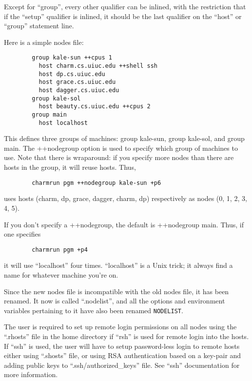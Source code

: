 \begin{itemize}
Except for ``group'', every other qualifier can be inlined, with the
restriction that if the ``setup'' qualifier is inlined, it should be
the last qualifier on the ``host'' or ``group'' statement line.

Here is a simple nodes file:

\begin{verbatim}
        group kale-sun ++cpus 1
          host charm.cs.uiuc.edu ++shell ssh
          host dp.cs.uiuc.edu
          host grace.cs.uiuc.edu
          host dagger.cs.uiuc.edu
        group kale-sol
          host beauty.cs.uiuc.edu ++cpus 2
        group main
          host localhost
\end{verbatim}

This defines three groups of machines: group kale-sun, group kale-sol,
and group main.  The ++nodegroup option is used to specify which group
of machines to use.  Note that there is wraparound: if you specify
more nodes than there are hosts in the group, it will reuse
hosts. Thus,

\begin{verbatim}
        charmrun pgm ++nodegroup kale-sun +p6
\end{verbatim}

uses hosts (charm, dp, grace, dagger, charm, dp) respectively as
nodes (0, 1, 2, 3, 4, 5).

If you don't specify a ++nodegroup, the default is ++nodegroup main.
Thus, if one specifies

\begin{verbatim}
        charmrun pgm +p4
\end{verbatim}

it will use ``localhost'' four times.  ``localhost'' is a Unix
trick; it always find a name for whatever machine you're on.

Since the new nodes file is incompatible with the old nodes file, it has
been renamed.  It now is called ``.nodelist'', and all the options and
environment variables pertaining to it have also been renamed {\tt NODELIST}.

The user is required to set up remote login permissions on all nodes
using the ``.rhosts'' file in the home directory if ``rsh'' is used for remote
login into the hosts. If ``ssh'' is used, the user will have to setup
password-less login to remote hosts either using ``.shosts'' file, or using
RSA authentication based on a key-pair and adding public keys to ``.ssh/authorized\_keys'' file. See ``ssh'' documentation for more information.

\end{itemize}

